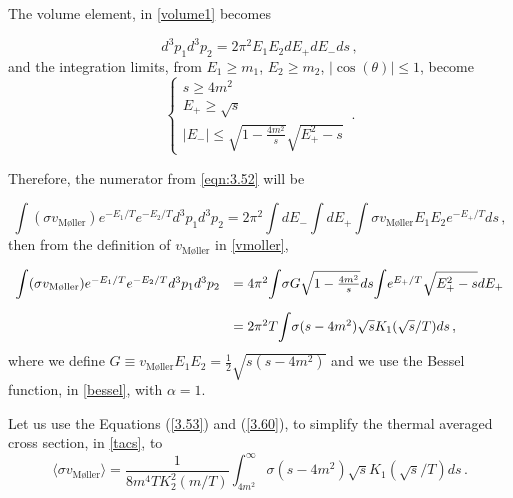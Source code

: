 The volume element, in \autoref{volume1} becomes

\begin{equation}
	\label{volume2}
	d^3p_1d^3p_2=2\pi^2E_1E_2dE_+dE_-ds\,,
\end{equation}
and the integration limits, from $E_1\geq m_1$, $E_2\geq m_2$, $|\cos(\theta)|\leq 1$, become
\begin{equation}
	\left\{
	\begin{array}{l}
		s \geq 4m^2 \\
		E_+\geq \sqrt{s} \\
		|E_-| \leq \sqrt{1-\frac{4m^2}{s}} \sqrt{E_+^2-s}
	\end{array}
	\right.\,.
\end{equation}

Therefore, the numerator from \autoref{eqn:3.52} will be

\begin{equation}
	\int (\sigma v_{\textrm{M{\o}ller}})e^{-E_1/T}e^{-E_2/T}d^3p_1d^3p_2=2\pi^2\int dE_- \int dE_+ \int \sigma v_{\textrm{M{\o}ller}} E_1 E_2 e^{-E_+/T}ds\,,
\end{equation}
then from the definition of $v_{\textrm{M{\o}ller}}$ in \autoref{vmoller},

\begin{align}
	\label{3.60}
	\begin{array}{ll}
		\mathlarger{\int} (\sigma v_{\textrm{M{\o}ller}})e^{-E_1/T}e^{-E_2/T}d^3p_1d^3p_2&=
		4\pi^2 \mathlarger{\int} \sigma G \sqrt{1-\frac{4m^2}{s}}ds \mathlarger{\int} e^{E_+/T}\sqrt{E_+^2-s}dE_+ \\ [15pt]
		&= 2\pi^2 T \mathlarger{\int} \sigma (s-4m^2) \sqrt{s}K_1(\sqrt{s}/T)ds\,,
	\end{array}
\end{align}
where we define $G \equiv v_{\textrm{M{\o}ller}}E_1E_2=\frac{1}{2}\sqrt{s(s-4m^2)}$ and we use the Bessel function, in \autoref{bessel}, with $\alpha=1$.

Let us use the Equations (\ref{3.53}) and (\ref{3.60}), to simplify the thermal averaged cross section, in \autoref{tacs}, to
\begin{equation}
	\label{sigmav}
	\langle \sigma v_{\textrm{M{\o}ller}}\rangle=\frac{1}{8m^4TK_2^2(m/T)}\int_{4m^2}^{\infty}\sigma(s-4m^2)\sqrt{s}K_1(\sqrt{s}/T)ds\,.
\end{equation}

